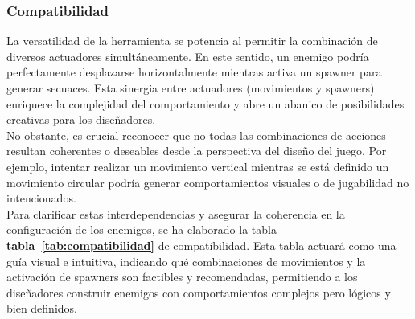 \subsubsection{Compatibilidad}
La versatilidad de la herramienta se potencia al permitir la combinación de diversos actuadores simultáneamente. En este sentido, un enemigo podría perfectamente desplazarse horizontalmente mientras activa un spawner para generar secuaces. Esta sinergia entre actuadores (movimientos y spawners) enriquece la complejidad del comportamiento y abre un abanico de posibilidades creativas para los diseñadores.\\
No obstante, es crucial reconocer que no todas las combinaciones de acciones resultan coherentes o deseables desde la perspectiva del diseño del juego. Por ejemplo, intentar realizar un movimiento vertical mientras se está definido un movimiento circular podría generar comportamientos visuales o de jugabilidad no intencionados. \\
Para clarificar estas interdependencias y asegurar la coherencia en la configuración de los enemigos, se ha elaborado la tabla \textbf{tabla~\ref{tab:compatibilidad}} de compatibilidad. Esta tabla actuará como una guía visual e intuitiva, indicando qué combinaciones de movimientos y la activación de spawners son factibles y recomendadas, permitiendo a los diseñadores construir enemigos con comportamientos complejos pero lógicos y bien definidos.

\begin{table}[!h]
    \centering

    \renewcommand{\arraystretch}{1.5}
    \setlength{\tabcolsep}{4pt} %
    \caption{Matriz de compatibilidad de movimientos}
    \label{tab:compatibilidad}
\end{table}
